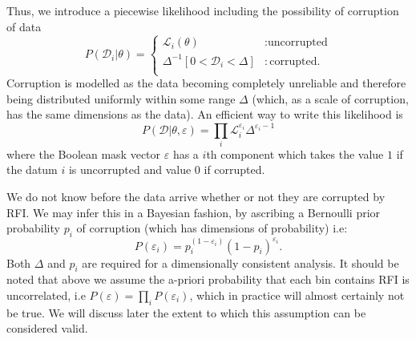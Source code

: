 \documentclass[fleqn,usenatbib]{mnras}
\begin{document}
Thus, we introduce a piecewise likelihood including the possibility of corruption of data
\begin{equation}
    P(\mathcal{D}_i|\theta) = \begin{cases}
        \mathcal{L}_i(\theta) &: \text{uncorrupted}\\
        \Delta^{-1}[ 0<\mathcal{D}_i<\Delta] &: \text{corrupted}.\\
    \end{cases}
\end{equation}
Corruption is modelled as the data becoming completely unreliable and therefore being distributed uniformly within some range $\Delta$ (which, as a scale of corruption, has the same dimensions as the data).
An efficient way to write this likelihood is
\begin{equation}
    P(\mathcal{D}|\theta, \varepsilon) = \prod_{i} \mathcal{L}_{i}^{\varepsilon_{i}} \Delta^{\varepsilon_i-1}
    \label{eq:li2}
\end{equation}
where the Boolean mask vector $\varepsilon$ has a $i$th component which takes the value $1$ if the datum $i$ is uncorrupted and value $0$ if corrupted.

We do not know before the data arrive whether or not they are corrupted by RFI. We may infer this in a Bayesian fashion, by ascribing a Bernoulli prior probability $p_i$ of corruption (which has dimensions of probability) i.e:
\begin{equation}
P(\varepsilon_i) = p_i^{(1-\varepsilon_i)}(1-p_i)^{\varepsilon_i}.\label{eq:pei}
\end{equation}
Both $\Delta$ and $p_i$ are required for a dimensionally consistent analysis. It should be noted that above we assume the a-priori probability that each bin contains RFI is uncorrelated, i.e $P(\varepsilon)=\prod _i P(\varepsilon_i)$, which in practice will almost certainly not be true. We will discuss later the extent to which this assumption can be considered valid.
\end{document}
